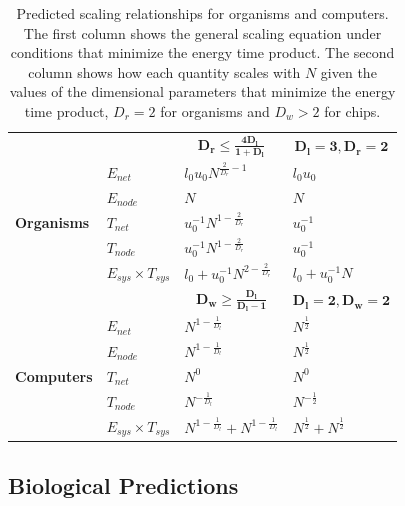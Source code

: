 \documentclass[12pt]{article}
\begin{document}
\begin{table}
\centering
\begin{tabular}{l|l||l|l|}
\multicolumn{2}{l}{} & \multicolumn{1}{c}{$\mathbf{D_r \leq \frac{4D_l}{1+D_l}}$} & \multicolumn{1}{c}{$\mathbf{D_l=3, D_r=2}$}\\
  \cline{2-4}
\multirow{5}{*}{\textbf{Organisms}} & $E_{net}$ &$l_0u_0 N^{\frac{2}{D_r}-1}$ &  $l_0 u_0$\\
\cline{2-4}
& $E_{node}$ &  $N$ & $N$ \\
\cline{2-4}
& $T_{net}$ & $u_0^{-1}N^{1-\frac{2}{D_r}}$ & $u_0^{-1}$\\
\cline{2-4}
& $T_{node}$ & $u_0^{-1}N^{1-\frac{2}{D_r}}$ & $u_0^{-1}$ \\
\cline{2-4}
& $E_{sys} \times T_{sys}$ & $l_0 + u_0^{-1}N^{2-\frac{2}{D_r}}$& $l_0 + u_0^{-1} N$\\
\cline{2-4}
\multicolumn{2}{c}{}  & \multicolumn{1}{c}{$\mathbf{D_w \geq \frac{D_l}{D_l-1}}$} & \multicolumn{1}{c}{$\mathbf{D_l=2,D_w =2}$} \\
\cline{2-4}

\multirow{5}{*}{\textbf{Computers}} & $E_{net}$ & $N^{1-\frac{1}{D_l}}$& $N^{\frac{1}{2}}$\\
\cline{2-4}
& $E_{node}$&$N^{1-\frac{1}{D_l}}$ &$N^{\frac{1}{2}}$ \\
\cline{2-4}
& $T_{net}$ & $N^{0}$& $N^{0}$\\
\cline{2-4}
& $T_{node}$& $N^{-\frac{1}{D_l}}$& $N^{-\frac{1}{2}}$\\
\cline{2-4}
& $E_{sys} \times T_{sys}$ &$N^{1-\frac{1}{D_l}} + N^{1-\frac{1}{D_l}}$ &$N^{\frac{1}{2}} + N^{\frac{1}{2}}$ \\
\cline{2-4}
\end{tabular}
\caption{Predicted scaling relationships for organisms and computers. The first column shows the general scaling equation under conditions that minimize the energy time product. The second column shows how each quantity scales with $N$ given the values of the dimensional parameters that minimize the energy time product, $D_r = 2$ for organisms and $D_w > 2$ for chips. 
\label{tab:SummaryScalingPredictions}}
\end{table}

\subsection{Biological Predictions}
\label{sec:bio-predictions}
\end{document}
